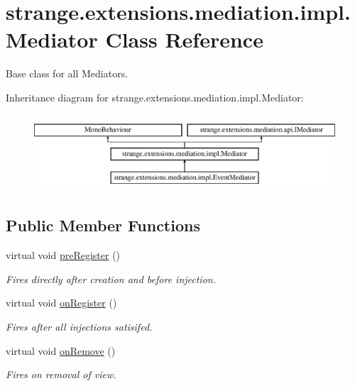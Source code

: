 \hypertarget{classstrange_1_1extensions_1_1mediation_1_1impl_1_1_mediator}{\section{strange.\-extensions.\-mediation.\-impl.\-Mediator Class Reference}
\label{classstrange_1_1extensions_1_1mediation_1_1impl_1_1_mediator}
}


Base class for all Mediators.  


Inheritance diagram for strange.\-extensions.\-mediation.\-impl.\-Mediator\-:\begin{figure}[H]
\begin{center}
\leavevmode
\includegraphics[height=2.857143cm]{classstrange_1_1extensions_1_1mediation_1_1impl_1_1_mediator}
\end{center}
\end{figure}
\subsection*{Public Member Functions}
\begin{DoxyCompactItemize}
\item 
\hypertarget{classstrange_1_1extensions_1_1mediation_1_1impl_1_1_mediator_a284db743d4cdf5d75d34fbad151eaf99}{virtual void \hyperlink{classstrange_1_1extensions_1_1mediation_1_1impl_1_1_mediator_a284db743d4cdf5d75d34fbad151eaf99}{pre\-Register} ()}\label{classstrange_1_1extensions_1_1mediation_1_1impl_1_1_mediator_a284db743d4cdf5d75d34fbad151eaf99}

\begin{DoxyCompactList}\small\item\em Fires directly after creation and before injection. \end{DoxyCompactList}\item 
virtual void \hyperlink{classstrange_1_1extensions_1_1mediation_1_1impl_1_1_mediator_a27b0053397aac6c6136b1794b10718de}{on\-Register} ()
\begin{DoxyCompactList}\small\item\em Fires after all injections satisifed. \end{DoxyCompactList}\item 
virtual void \hyperlink{classstrange_1_1extensions_1_1mediation_1_1impl_1_1_mediator_a9c65534ae8c37db9f4db7c84a94cd635}{on\-Remove} ()
\begin{DoxyCompactList}\small\item\em Fires on removal of view. \end{DoxyCompactList}\end{DoxyCompactItemize}

